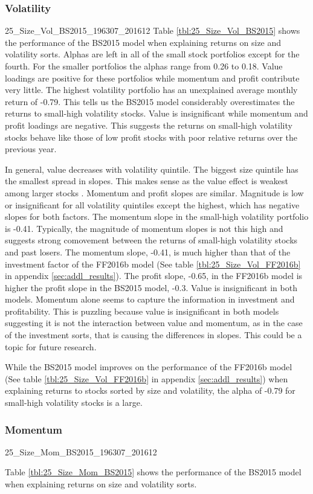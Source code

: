 \subsubsection{Volatility}

{25_Size_Vol_BS2015_196307_201612}
Table \ref{tbl:25_Size_Vol_BS2015} shows the performance of the BS2015 model when
explaining returns on size and volatility sorts. Alphas are left in all of the small stock
portfolios except for the fourth. For the smaller portfolios the alphas range from 0.26 to
0.18. Value loadings are positive for these portfolios while momentum and profit
contribute very little. The highest volatility portfolio has an unexplained average
monthly return of -0.79. This tells us the BS2015 model considerably overestimates the
returns to small-high volatility stocks. Value is insignificant while momentum and profit
loadings are negative. This suggests the returns on small-high volatility stocks behave
like those of low profit stocks with poor relative returns over the previous year.

In general, value decreases with volatility quintile. The biggest size quintile has the
smallest spread in slopes. This makes sense as the value effect is weakest among larger
stocks \parencite{asness2015fact}. Momentum and profit slopes are similar. Magnitude is
low or insignificant for all volatility quintiles except the highest, which has negative
slopes for both factors. The momentum slope in the small-high volatility portfolio is
-0.41. Typically, the magnitude of momentum slopes is not this high and suggests strong
comovement between the returns of small-high volatility stocks and past losers. The
momentum slope, -0.41, is much higher than that of the investment factor of the FF2016b
model (See table \ref{tbl:25_Size_Vol_FF2016b} in appendix \ref{sec:addl_results}). The
profit slope, -0.65, in the FF2016b model is higher the profit slope in the BS2015 model,
-0.3. Value is insignificant in both models. Momentum alone seems to capture the
information in investment and profitability. This is puzzling because value is
insignificant in both models suggesting it is not the interaction between value and
momentum, as in the case of the investment sorts, that is causing the differences in
slopes. This could be a topic for future research.

While the BS2015 model improves on the performance of the FF2016b model (See table
\ref{tbl:25_Size_Vol_FF2016b} in appendix \ref{sec:addl_results}) when explaining returns
to stocks sorted by size and volatility, the alpha of -0.79 for small-high volatility
stocks is a large.


\subsubsection{Momentum}

{25_Size_Mom_BS2015_196307_201612}

Table \ref{tbl:25_Size_Mom_BS2015} shows the performance of the BS2015 model when
explaining returns on size and volatility sorts.
